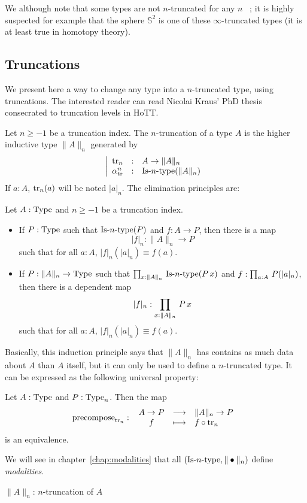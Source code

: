 We although note that some types are not $n$-truncated for any
$n$~\cite[Example 8.8.6]{hottbook} ; it is highly suspected for
example that the sphere $\mathbb S^2$ is one of
these $\infty$-truncated types (it is at least true in homotopy theory).


\subsection{Truncations}
\label{ssec:trunc}

We present here a way to change any type into a $n$-truncated type, using
truncations. The interested reader can read Nicolai Kraus' PhD
thesis~\cite{phdkraus} consecrated to truncation levels in HoTT.

Let $n\geqslant -1$ be a truncation index. The $n$-truncation of a
type $A$ is the
higher inductive type $\|A\|_n$ 
 generated by
\[
  \left|
    \begin{array}{lll}
      \operatorname{tr}_n &:& A \to \|A\|_n \\
      \alpha_{\operatorname{tr}}^n &:& \mathop{\mathrm{Is{\hbox{-}}}n\mathrm{{\hbox{-}} type}} (\|A\|_n)
    \end{array}
  \right.
\]
If $a:A$, $\operatorname{tr}_n(a)$ will be noted $|a|_n$.
The elimination principles are:
\begin{lem}\label{lem:trunc_elim}
  Let $A:\operatorname{Type}$ and $n\geqslant -1$ be a truncation index.
  \begin{itemize}
  \item If $P:\operatorname{Type}$ such that $\mathop{\mathrm{Is{\hbox{-}}}n\mathrm{{\hbox{-}} type}}(P)$ and $f:A \to P$, then
    there is a map
    \[|f|_n : \|A\|_n \to P\]
    such that for all $a:A$, $|f|_n(|a|_n) \equiv f(a)$.
  \item If $P:\|A\|_n \to \operatorname{Type}$ such that $\prod_{x:\|A\|_n}\, \mathop{\mathrm{Is{\hbox{-}}}n\mathrm{{\hbox{-}} type}} (P\, x)$ and $f:\prod_{a:A}\, P(|a|_n)$, then there is
    a dependent map
    \[|f|_n : \prod_{x:\|A\|_n}\, P\, x\]
    such that for all $a:A$, $|f|_n(|a|_n) \equiv f(a)$.
  \end{itemize}
\end{lem}
Basically, this induction principle says that $\|A\|_n$ has contains
as much data about $A$ than $A$ itself, but it can only be used to
define a $n$-truncated type. It can be expressed as the following
universal property:
\begin{lem}
  Let $A:\operatorname{Type}$ and $P:\operatorname{Type}_n$. Then the map
\[
  \operatorname{\mathrm{precompose}}_{\operatorname{tr}_n} \, \colon \left. \begin{array}{ccl} A\to P & \longrightarrow & \|A\|_n \to P \\ f & \longmapsto & f \circ \operatorname{tr}_n \end{array} \right.
\]
is an equivalence.
\end{lem}
We will see in chapter~\ref{chap:modalities} that all $(\mathop{\mathrm{Is{\hbox{-}}}n\mathrm{{\hbox{-}} type}},\|\bullet\|_n)$ define {\em modalities}.



$\|A\|_n$: $n$-truncation of $A$%
 
